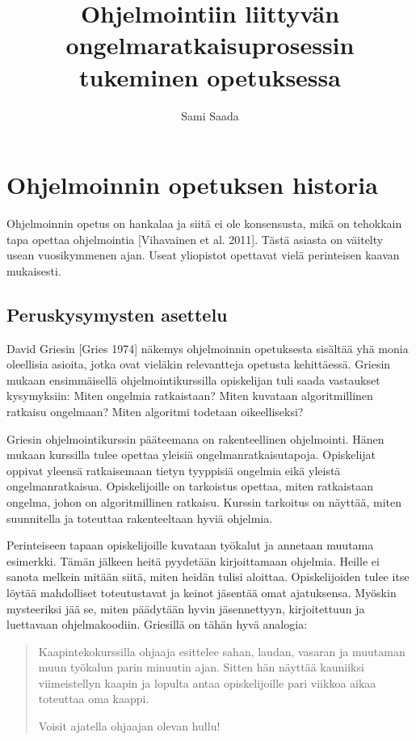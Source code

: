 \documentclass[a4paper]{article}
\author{Sami Saada}
\title{Ohjelmointiin liittyvän ongelmaratkaisuprosessin tukeminen opetuksessa}
\begin{document}
\maketitle \thispagestyle{empty}

\newpage

\setcounter{page}{1}

\section{Ohjelmoinnin opetuksen historia}

Ohjelmoinnin opetus on hankalaa ja siitä ei ole konsensusta, mikä on tehokkain tapa opettaa ohjelmointia [Vihavainen et al. 2011]. Tästä asiasta on väitelty usean vuosikymmenen ajan. Useat yliopistot opettavat vielä perinteisen kaavan mukaisesti.

\subsection{Peruskysymysten asettelu}

David Griesin [Gries 1974] näkemys ohjelmoinnin opetuksesta sisältää yhä monia oleellisia asioita, jotka ovat vieläkin relevantteja opetusta kehittäessä. Griesin mukaan ensimmäisellä ohjelmointikurssilla opiskelijan tuli saada vastaukset kysymyksiin: Miten ongelmia ratkaistaan? Miten kuvataan algoritmillinen ratkaisu ongelmaan? Miten algoritmi todetaan oikeelliseksi?

Griesin ohjelmointikurssin pääteemana on rakenteellinen ohjelmointi. Hänen mukaan kurssilla tulee opettaa yleisiä ongelmanratkaisutapoja. Opiskelijat oppivat yleensä ratkaisemaan tietyn tyyppisiä ongelmia eikä yleistä ongelmanratkaisua. Opiskelijoille on tarkoistus opettaa, miten ratkaistaan ongelma, johon on algoritmillinen ratkaisu. Kurssin tarkoitus on näyttää, miten suunnitella ja toteuttaa rakenteeltaan hyviä ohjelmia.

Perinteiseen tapaan opiskelijoille kuvataan työkalut ja annetaan muutama esimerkki. Tämän jälkeen heitä pyydetään kirjoittamaan ohjelmia. Heille ei sanota melkein mitään siitä, miten heidän tulisi aloittaa. Opiskelijoiden tulee itse löytää mahdolliset toteutustavat ja keinot jäsentää omat ajatuksensa. Myöskin mysteeriksi jää se, miten päädytään hyvin jäsennettyyn, kirjoitettuun ja luettavaan ohjelmakoodiin. Griesillä on tähän hyvä analogia:

\begin{quotation}
Kaapintekokurssilla ohjaaja esittelee sahan, laudan, vasaran ja muutaman muun työkalun parin minuutin ajan. Sitten hän näyttää kauniiksi viimeistellyn kaapin ja lopulta antaa opiskelijoille pari viikkoa aikaa toteuttaa oma kaappi.

Voisit ajatella ohjaajan olevan hullu!
\end{quotation}
\end{document}
